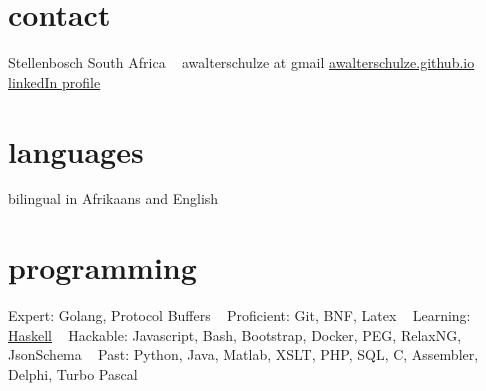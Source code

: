 \documentclass[]{friggeri-cv} %
\begin{document}

\begin{aside} %
\section{contact}
Stellenbosch
South Africa
~
awalterschulze at gmail
\href{http://awalterschulze.github.io}{awalterschulze.github.io}
\href{https://za.linkedin.com/in/schulzewalter}{linkedIn profile}
\section{languages}
bilingual in Afrikaans and English
\section{programming}
%
Expert: 
Golang, Protocol Buffers
~
Proficient: 
Git, BNF, Latex
~
Learning: 
\href{https://trello.com/b/ij35amXZ/mylearninghaskell}{Haskell}
~
Hackable:
Javascript, Bash, Bootstrap, Docker, PEG, RelaxNG, JsonSchema
~
Past:
Python, Java, Matlab, XSLT, PHP, SQL, C, Assembler, Delphi, Turbo Pascal
\end{aside}
\end{document}
